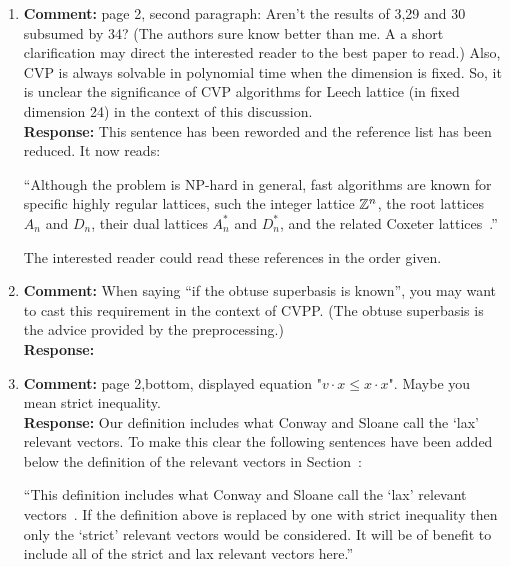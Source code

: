 \documentclass[a4paper,10pt]{article}
\begin{document}
\begin{enumerate}
\item\textbf{Comment:}  
page 2, second paragraph: Aren't the results of 3,29 and 30 subsumed by 34? (The authors sure know better than me. A a short clarification may direct the interested reader to the best paper to read.) Also, CVP is always solvable in polynomial time when the dimension is fixed. So, it is unclear the significance of CVP algorithms for Leech lattice (in fixed dimension 24) in the context of this discussion. 
\\\textbf{Response:}
This sentence has been reworded and the reference list has been reduced.  It now reads:

``Although the problem is NP-hard in general, fast algorithms are known for specific highly regular lattices, such the integer lattice ${\mathbb Z}^{n}$, the root lattices $A_n$ and $D_n$, their dual lattices $A_n^*$ and $D_n^*$, and the related Coxeter lattices~\cite[Chap.~4]{SPLAG}\cite{Conway1982FastQuantDec, McKilliam2008, McKilliam2009CoxeterLattices}.''

The interested reader could read these references in the order given. %

\item\textbf{Comment:}  
When saying ``if the obtuse superbasis is known'', you may want to cast this requirement in the context of CVPP. (The obtuse superbasis is the advice provided by the preprocessing.) 
\\\textbf{Response:}


\item\textbf{Comment:}  
page 2,bottom, displayed equation "$v \cdot x \leq x \cdot x$". Maybe you mean strict inequality.
\\\textbf{Response:}
Our definition includes what Conway and Sloane call the `lax' relevant vectors.  To make this clear the following sentences have been added below the definition of the relevant vectors in Section~:

``This definition includes what Conway and Sloane call the `lax' relevant vectors~\cite{ConwaySloane1992_voronoi_lattice_3d_obtuse_superbases}.  If the definition above is replaced by one with strict inequality then only the `strict' relevant vectors would be considered. It will be of benefit to include all of the strict and lax relevant vectors here.''


\end{enumerate}
\end{document}
